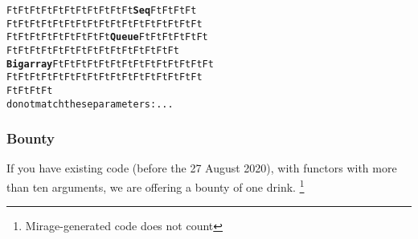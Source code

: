 \documentclass[11pt,aspectratio=169]{beamer}
\begin{document}
\begin{frame}[fragile]
\begin{alltt}
  {\color{green}{}Ft} {\color{green}{}Ft} {\color{green}{}Ft} {\color{green}{}Ft} {\color{green}{}Ft} {\color{green}{}Ft} {\color{green}{}Ft} {\color{green}{}Ft} {\color{green}{}Ft} {\color{green}{}Ft} {\color{green}{}Ft} {\color{red}{}\bfseries{}Seq} {\color{green}{}Ft} {\color{green}{}Ft} {\color{green}{}Ft} {\color{green}{}Ft}
  {\color{green}{}Ft} {\color{green}{}Ft} {\color{green}{}Ft} {\color{green}{}Ft} {\color{green}{}Ft} {\color{green}{}Ft} {\color{green}{}Ft} {\color{green}{}Ft} {\color{green}{}Ft} {\color{green}{}Ft} {\color{green}{}Ft} {\color{green}{}Ft} {\color{green}{}Ft} {\color{green}{}Ft} {\color{green}{}Ft} {\color{green}{}Ft} {\color{green}{}Ft}
  {\color{green}{}Ft} {\color{green}{}Ft} {\color{green}{}Ft} {\color{green}{}Ft} {\color{green}{}Ft} {\color{green}{}Ft} {\color{green}{}Ft} {\color{green}{}Ft} {\color{green}{}Ft} {\color{red}{}\bfseries{}Queue} {\color{green}{}Ft} {\color{green}{}Ft} {\color{green}{}Ft} {\color{green}{}Ft} {\color{green}{}Ft} {\color{green}{}Ft}
  {\color{green}{}Ft} {\color{green}{}Ft} {\color{green}{}Ft} {\color{green}{}Ft} {\color{green}{}Ft} {\color{green}{}Ft} {\color{green}{}Ft} {\color{green}{}Ft} {\color{green}{}Ft} {\color{green}{}Ft} {\color{green}{}Ft} {\color{green}{}Ft} {\color{green}{}Ft} {\color{green}{}Ft} {\color{green}{}Ft}
  {\color{red}{}\bfseries{}Bigarray} {\color{green}{}Ft} {\color{green}{}Ft} {\color{green}{}Ft} {\color{green}{}Ft} {\color{green}{}Ft} {\color{green}{}Ft} {\color{green}{}Ft} {\color{green}{}Ft} {\color{green}{}Ft} {\color{green}{}Ft} {\color{green}{}Ft} {\color{green}{}Ft} {\color{green}{}Ft} {\color{green}{}Ft}
  {\color{green}{}Ft} {\color{green}{}Ft} {\color{green}{}Ft} {\color{green}{}Ft} {\color{green}{}Ft} {\color{green}{}Ft} {\color{green}{}Ft} {\color{green}{}Ft} {\color{green}{}Ft} {\color{green}{}Ft} {\color{green}{}Ft} {\color{green}{}Ft} {\color{green}{}Ft} {\color{green}{}Ft} {\color{green}{}Ft} {\color{green}{}Ft} {\color{green}{}Ft}
  {\color{green}{}Ft} {\color{green}{}Ft} {\color{green}{}Ft} {\color{green}{}Ft}
do not match these parameters: ...
\end{alltt}

\end{frame}

\begin{frame}\frametitle{Bounty}
  If you have existing code (before the 27 August 2020), with functors with more
  than ten arguments, we are offering a bounty of one drink.%
  \footnote{Mirage-generated code does not count}
\end{frame}
\end{document}
